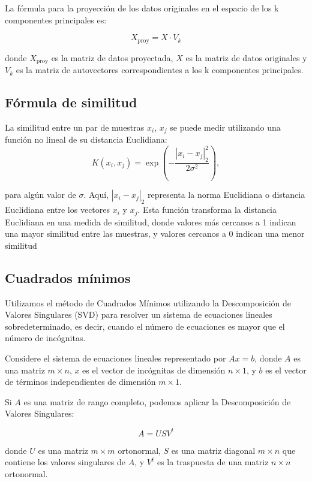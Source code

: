 \documentclass[12pt,a4]{article} %
\begin{document}
La fórmula para la proyección de los datos originales en el espacio de los k componentes principales es:

\[
X_{\text{proy}} = X \cdot V_k
\]

donde \(X_{\text{proy}}\) es la matriz de datos proyectada, \(X\) es la matriz de datos originales y \(V_k\) es la matriz de autovectores correspondientes a los k componentes principales.



\subsection{Fórmula de similitud}
\label{similitud}
La similitud entre un par de muestras $x_i$, $x_j$ se puede medir utilizando una función no lineal de su distancia Euclidiana:
\begin{equation}
    K (x_i, x_j) = \exp \left( -\frac{|x_i - x_j|_2^2}{2\sigma^2} \right),
    \label{eq: Similitud}
\end{equation}


para algún valor de $\sigma$. Aquí, $|x_i - x_j|_2$ representa la norma Euclidiana o distancia Euclidiana entre los vectores $x_i$ y $x_j$. Esta función transforma la distancia Euclidiana en una medida de similitud, donde valores más cercanos a 1 indican una mayor similitud entre las muestras, y valores cercanos a 0 indican una menor similitud

\subsection{Cuadrados mínimos}
\label{cuads_mins}

Utilizamos el método de Cuadrados Mínimos utilizando la Descomposición de Valores Singulares (SVD) para resolver un sistema de ecuaciones lineales sobredeterminado, es decir, cuando el número de ecuaciones es mayor que el número de incógnitas.

Considere el sistema de ecuaciones lineales representado por $Ax = b$, donde $A$ es una matriz $m \times n$, $x$ es el vector de incógnitas de dimensión $n \times 1$, y $b$ es el vector de términos independientes de dimensión $m \times 1$.

Si $A$ es una matriz de rango completo, podemos aplicar la Descomposición de Valores Singulares:

\[
A = USV^t
\]

donde $U$ es una matriz $m \times m$ ortonormal, $S$ es una matriz diagonal $m \times n$ que contiene los valores singulares de $A$, y $V^t$ es la traspuesta de una matriz $n \times n$ ortonormal.
\end{document}
